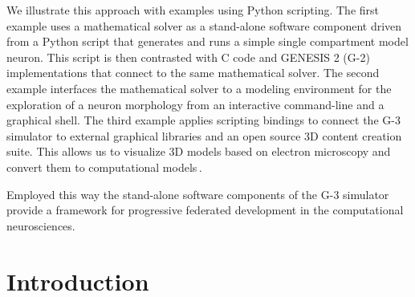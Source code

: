 \documentclass[12pt]{article}
\begin{document}

We illustrate this approach with examples using Python scripting.  The first example uses a
mathematical solver as a stand-alone software component driven from a
Python script that generates and runs a simple single compartment
model neuron.  This script is then contrasted with C code and
GENESIS 2 (G-2) implementations that connect to the same mathematical
solver.  The second example interfaces the mathematical solver to a
modeling environment for the exploration of a neuron morphology from
an interactive command-line and a graphical shell.  The third example
applies scripting bindings to connect the G-3 simulator to
external graphical libraries and an open source 3D content creation
suite. This allows us to visualize 3D models based on electron
microscopy and convert them to computational
models\,\cite{cornelis08:_model_neuros_genes}.

Employed this way the stand-alone software components of the G-3 
simulator provide a framework for progressive federated
development in the computational neurosciences.


\section{Introduction}
\end{document}
